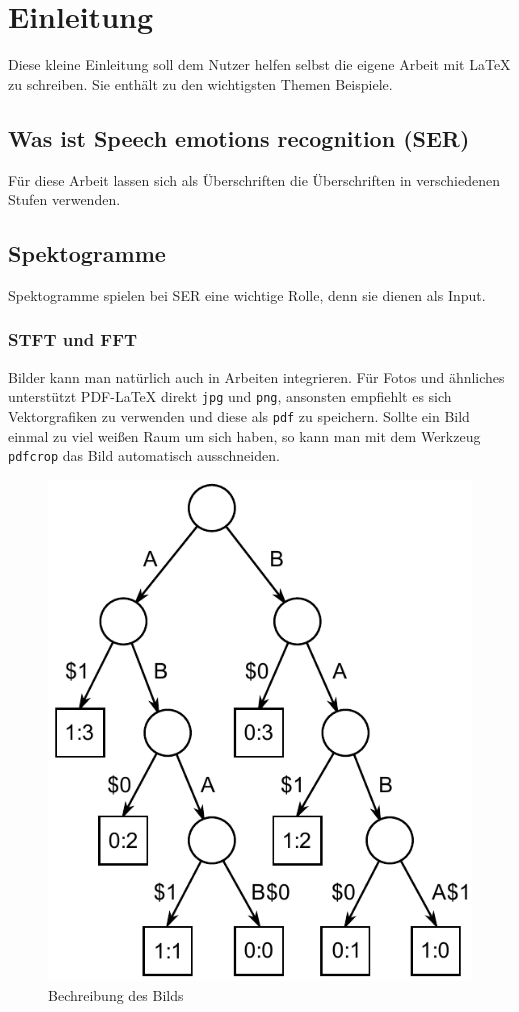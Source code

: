 \chapter{Einleitung}

Diese kleine Einleitung soll dem Nutzer helfen selbst die eigene Arbeit mit \LaTeX{} zu schreiben. Sie enthält zu den wichtigsten Themen Beispiele.


\section{Was ist Speech emotions recognition (SER)}

Für diese Arbeit lassen sich als Überschriften die Überschriften in verschiedenen Stufen verwenden.

\section{Spektogramme}
Spektogramme spielen bei SER eine wichtige Rolle, denn sie dienen als Input. 

\subsection{STFT und FFT}

Bilder kann man natürlich auch in Arbeiten integrieren. Für Fotos und ähnliches unterstützt PDF-\LaTeX{} direkt \verb|jpg| und \verb|png|, ansonsten empfiehlt es sich Vektorgrafiken zu verwenden und diese als \verb|pdf| zu speichern. Sollte ein Bild einmal zu viel weißen Raum um sich haben, so kann man mit dem Werkzeug \verb|pdfcrop| das Bild automatisch ausschneiden\cite{pdfcrop}.

\begin{figure}[ht]
    \centering
    \includegraphics[width=.4\textwidth]{images/Suffix_tree_ABAB_BABA}
    \caption{\label{anker}Bechreibung des Bilds}
\end{figure}

